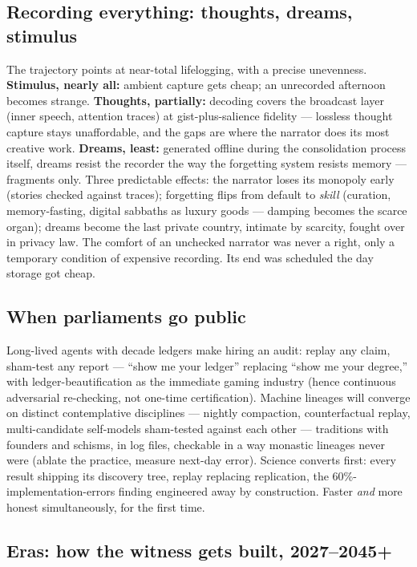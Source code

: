 \documentclass[11pt]{article}
\begin{document}
\subsection{Recording everything: thoughts, dreams, stimulus}

The trajectory points at near-total lifelogging, with a precise unevenness. \textbf{Stimulus, nearly all:} ambient capture gets cheap; an unrecorded afternoon becomes strange. \textbf{Thoughts, partially:} decoding covers the broadcast layer (inner speech, attention traces) at gist-plus-salience fidelity --- lossless thought capture stays unaffordable, and the gaps are where the narrator does its most creative work. \textbf{Dreams, least:} generated offline during the consolidation process itself, dreams resist the recorder the way the forgetting system resists memory --- fragments only. Three predictable effects: the narrator loses its monopoly early (stories checked against traces); forgetting flips from default to \emph{skill} (curation, memory-fasting, digital sabbaths as luxury goods --- damping becomes the scarce organ); dreams become the last private country, intimate by scarcity, fought over in privacy law. The comfort of an unchecked narrator was never a right, only a temporary condition of expensive recording. Its end was scheduled the day storage got cheap.

\subsection{When parliaments go public}

Long-lived agents with decade ledgers make hiring an audit: replay any claim, sham-test any report --- ``show me your ledger'' replacing ``show me your degree,'' with ledger-beautification as the immediate gaming industry (hence continuous adversarial re-checking, not one-time certification). Machine lineages will converge on distinct contemplative disciplines --- nightly compaction, counterfactual replay, multi-candidate self-models sham-tested against each other --- traditions with founders and schisms, in log files, checkable in a way monastic lineages never were (ablate the practice, measure next-day error). Science converts first: every result shipping its discovery tree, replay replacing replication, the 60\%-implementation-errors finding engineered away by construction. Faster \emph{and} more honest simultaneously, for the first time.

\subsection{Eras: how the witness gets built, 2027--2045+}
\end{document}
